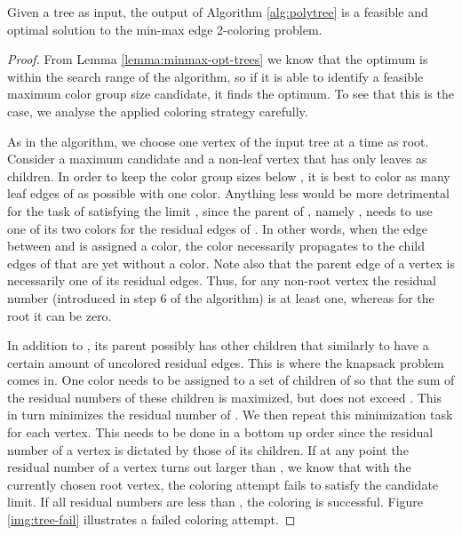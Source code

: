 \documentclass[runningheads, a4paper]{llncs}
\begin{document}
\begin{theorem}
Given a tree as input, the output of Algorithm \ref{alg:polytree} is a feasible and optimal solution to the min-max edge 2-coloring problem.
\end{theorem}
\begin{proof}
From Lemma \ref{lemma:minmax-opt-trees} we know that the optimum is within the search range of the algorithm, so if it is able to identify a feasible maximum color group size candidate, it finds the optimum. To see that this is the case, we analyse the applied coloring strategy carefully.

As in the algorithm, we choose one vertex of the input tree  at a time as root. Consider a maximum candidate  and a non-leaf vertex  that has only leaves as children. In order to keep the color group sizes below , it is best to color as many leaf edges of  as possible with one color. Anything less would be more detrimental for the task of satisfying the limit , since the parent of , namely , needs to use one of its two colors for the residual edges of . In other words, when the edge between  and  is assigned a color, the color necessarily propagates to the child edges of  that are yet without a color. Note also that the parent edge of a vertex is necessarily one of its residual edges. Thus, for any non-root vertex the residual number (introduced in step 6 of the algorithm) is at least one, whereas for the root it can be zero.

In addition to , its parent  possibly has other children that similarly to  have a certain amount of uncolored residual edges. This is where the knapsack problem comes in. One color needs to be assigned to a set of children of  so that the sum of the residual numbers of these children is maximized, but does not exceed . This in turn minimizes the residual number of . We then repeat this minimization task for each vertex. This needs to be done in a bottom up order since the residual number of a vertex is dictated by those of its children. If at any point the residual number of a vertex turns out larger than , we know that with the currently chosen root vertex, the coloring attempt fails to satisfy the candidate limit. If all residual numbers are less than , the coloring is successful. Figure \ref{img:tree-fail} illustrates a failed coloring attempt.




\end{proof}
\end{document}
